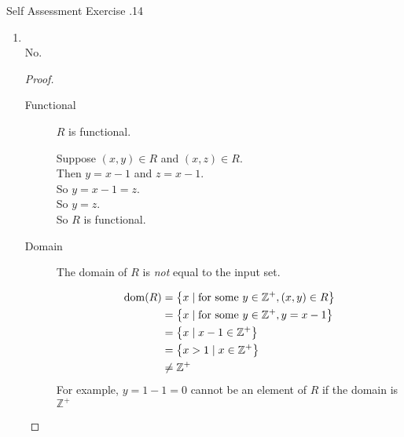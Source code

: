 \documentclass[../notes.tex]{subfiles}
\begin{document}
\begin{exercise}{Self Assessment Exercise \thechapter.14}
\begin{enumerate}
\begin{enumerate}[label=(\alph*)]
\begin{proof}
\begin{description}
												\begin{subproof}[Counterexample]
													$2 \in \mathbb{R}$, but there is no real number $y$ where $2^{2} + y^{2} = 1$.\\
													$\therefore \mathrm{dom}(R) \neq X$
												\end{subproof}
										\end{description}
										As $R$ is not functional, and the domain of $R$ is not equal to the input set, $R$ is not a function.
									\end{proof}
							\end{enumerate}
						\item {}\\
							No.
							\begin{proof}
								$ $
								\begin{description}
									\item[Functional] $R$ is functional.
										\begin{subproof}[Subproof]
											Suppose $(x, y) \in R$ and $(x, z) \in R$.\\
											Then $y = x - 1$ and $z = x - 1$.\\
											So $y = x - 1 = z$.\\
											So $y = z$.\\
											So $R$ is functional.
										\end{subproof}
									\item[Domain] The domain of $R$ is \emph{not} equal to the input set.
										\begin{subproof}[Subproof] \moveup
											\begin{align*}
												\mathrm{dom}(R) &= \bigl\{x \mid \text{for some } y \in \mathbb{Z}^{+}, (x, y) \in R\bigr\}\\
												&= \bigl\{x \mid \text{for some } y \in \mathbb{Z}^{+}, y = x - 1\bigr\}\\
												&= \bigl\{x \mid x - 1 \in \mathbb{Z}^{+}\bigr\}\\
												&= \bigl\{x > 1 \mid x \in \mathbb{Z}^{+}\bigr\}\\
												& \neq \mathbb{Z}^{+} \qedhere
											\end{align*}
											For example, $y = 1 - 1 = 0$ cannot be an element of $R$ if the domain is $\mathbb{Z}^{+}$
										\end{subproof}

\end{description}
\end{proof}
\end{enumerate}
\end{exercise}
\end{document}
